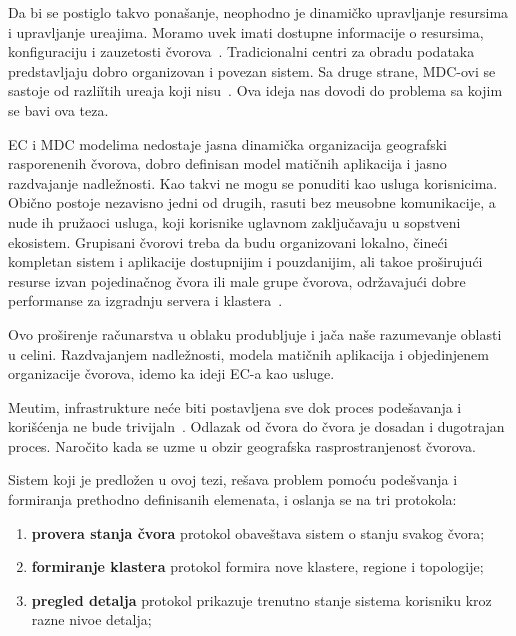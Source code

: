 Da bi se postiglo takvo pona\v sanje, neophodno je dinami\v cko upravljanje resursima i upravljanje ure\dj ajima. Moramo uvek imati dostupne informacije o resursima, konfiguraciju i zauzetosti \v cvorova~\cite{GubbiBMP13, WangZZWYW17}. Tradicionalni centri za obradu podataka predstavljaju dobro organizovan i povezan sistem. Sa druge strane, MDC-ovi se sastoje od razli\v itih ure\dj aja koji nisu~\cite{JiangCGZW19}. Ova ideja nas dovodi do problema sa kojim se bavi ova teza.

EC i MDC modelima nedostaje jasna dinami\v cka organizacija geografski raspore\dj nenih \v cvorova, dobro definisan model mati\v cnih aplikacija i jasno razdvajanje nadle\v znosti. Kao takvi ne mogu se ponuditi kao usluga korisnicima. Obi\v cno postoje nezavisno jedni od drugih, rasuti bez me\dj usobne komunikacije, a nude ih pru\v zaoci usluga, koji korisnike uglavnom zaklju\v cavaju u sopstveni ekosistem. Grupisani \v cvorovi treba da budu organizovani lokalno, \v cine\'ci kompletan sistem i aplikacije dostupnijim i pouzdanijim, ali tako\dj e pro\v siruju\'ci resurse izvan pojedina\v cnog \v cvora ili male grupe \v cvorova, odr\v zavaju\'ci dobre performanse za izgradnju servera i klastera~\cite{ArocaG12}.

Ovo pro\v sirenje ra\v cunarstva u oblaku produbljuje i ja\v ca na\v se razumevanje oblasti u celini. Razdvajanjem nadle\v znosti, modela mati\v cnih aplikacija i objedinjenem organizacije \v cvorova, idemo ka ideji EC-a kao usluge. 

Me\dj utim, infrastrukture ne\'ce biti postavljena sve dok proces pode\v savanja i kori\v s\'cenja ne bude trivijaln~\cite{SatyanarayananBCD09}. Odlazak od \v cvora do \v cvora je dosadan i dugotrajan proces. Naro\v cito kada se uzme u obzir geografska rasprostranjenost \v cvorova. 

Sistem koji je predlo\v zen u ovoj tezi, re\v sava problem pomo\'cu  pode\v svanja i formiranja prethodno definisanih elemenata, i oslanja se na tri protokola:

\begin{enumerate}[start=1,label={(\bfseries \arabic*)}]
	\item \textbf{provera stanja \v cvora} protokol obave\v stava sistem o stanju svakog \v cvora; 
	\item \textbf{formiranje klastera} protokol formira nove klastere, regione i topologije;  
	\item \textbf{pregled detalja} protokol prikazuje trenutno stanje sistema korisniku kroz razne nivoe detalja;
\end{enumerate}

